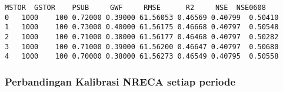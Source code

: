 \documentclass[11pt]{article}
\makeatletter
\newcommand{\boxspacing}{\kern\kvtcb@left@rule\kern\kvtcb@boxsep}
\newcommand{\prompt}[4]{
        \ttfamily\llap{{\color{#2}[#3]:\hspace{3pt}#4}}\vspace{-\baselineskip}
    }
\makeatother
\begin{document}
            \begin{tcolorbox}[breakable, size=fbox, boxrule=.5pt, pad at break*=1mm, opacityfill=0]
\prompt{Out}{outcolor}{0}{\boxspacing}
\begin{Verbatim}[commandchars=\\\{\}]
   MSTOR  GSTOR    PSUB     GWF     RMSE      R2     NSE  NSE0608
0   1000    100 0.72000 0.39000 61.56053 0.46569 0.40799  0.50410
1   1000    100 0.73000 0.40000 61.56175 0.46668 0.40797  0.50548
2   1000    100 0.71000 0.38000 61.56177 0.46468 0.40797  0.50282
3   1000    100 0.71000 0.39000 61.56200 0.46647 0.40797  0.50680
4   1000    100 0.70000 0.38000 61.56273 0.46549 0.40795  0.50558
\end{Verbatim}
\end{tcolorbox}
        
    \hypertarget{perbandingan-kalibrasi-nreca-setiap-periode}{%
\subsubsection{Perbandingan Kalibrasi NRECA setiap
periode}\label{perbandingan-kalibrasi-nreca-setiap-periode}}
\end{document}
